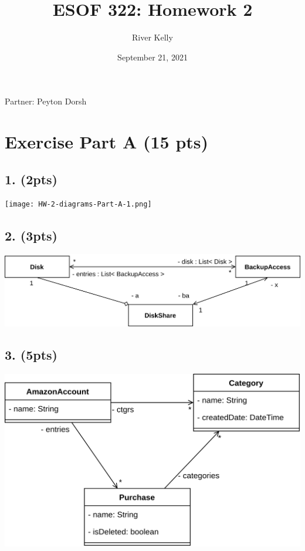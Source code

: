 \documentclass[12pt]{article}
\title{ESOF 322: Homework 2}
\author{River Kelly}
\date{September 21, 2021}
\begin{document}
\maketitle
\begin{center}
Partner: Peyton Dorsh    
\end{center}

\newpage

\section*{Exercise Part A (15 pts)}
\subsection*{1. (2pts)}
\texttt{[image: HW-2-diagrams-Part-A-1.png]}
\subsection*{2. (3pts)}
\includegraphics[width=\textwidth]{HW-2-diagrams-Part-A-2.png}
\subsection*{3. (5pts)}
\includegraphics[width=\textwidth]{HW-2-diagrams-Part-A-3.png}
\end{document}
